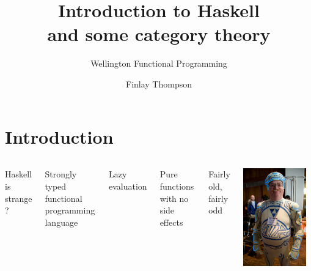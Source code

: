 \documentclass[xcolor={table}]{beamer}
\title{Introduction to Haskell\\and some category theory}
\subtitle{Wellington Functional Programming}
\author{Finlay Thompson}
\date{}
\begin{document}
\titleslide

\section{Introduction}

\begin{frame}{}{}

    \begin{columns}
    {\Large Haskell is strange ? }

    \pause\bigskip
    Strongly typed functional programming language

    \pause\bigskip
    Lazy evaluation
    
    \pause\bigskip
    Pure functions with no side effects 
    
    \pause\bigskip
    Fairly old\pause, fairly odd

    \includegraphics[width=0.9\textwidth]{images/tron-guy.jpg}
        
    \end{columns}

\end{frame}
\end{document}
